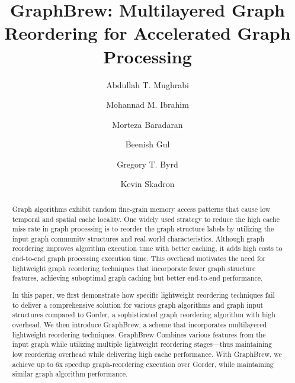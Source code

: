 \documentclass[sigconf, nonacm]{acmart}
\begin{document}
\title{GraphBrew: Multilayered Graph Reordering for Accelerated Graph Processing}

\author{Abdullah T. Mughrabi}

\author{Mohannad M. Ibrahim}

\author{Morteza Baradaran}

\author{Beenish Gul}


\author{Gregory T. Byrd}

\author{Kevin Skadron}
\begin{abstract}
Graph algorithms exhibit random fine-grain memory access patterns that cause low temporal and spatial cache locality. One widely used strategy to reduce the high cache miss rate in graph processing is to reorder the graph structure labels by utilizing the input graph community structures and real-world characteristics. Although graph reordering improves algorithm execution time with better caching, it adds high costs to end-to-end graph processing execution time. This overhead motivates the need for lightweight graph reordering techniques that incorporate fewer graph structure features, achieving suboptimal graph caching but better end-to-end performance.

In this paper, we first demonstrate how specific lightweight reordering techniques fail to deliver a comprehensive solution for various graph algorithms and graph input structures compared to Gorder, a sophisticated graph reordering algorithm with high overhead. We then introduce GraphBrew, a scheme that incorporates multilayered lightweight reordering techniques. GraphBrew Combines various features from the input graph while utilizing multiple lightweight reordering stages---thus maintaining low reordering overhead while delivering high cache performance. With GraphBrew, we achieve up to 6x speedup graph-reordering execution over Gorder, while maintaining similar graph algorithm performance.
\end{abstract}
\end{document}
